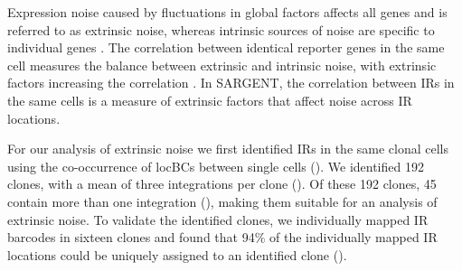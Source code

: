 Expression noise caused by fluctuations in global factors affects all genes and is referred to as extrinsic noise, whereas intrinsic sources of noise are specific to individual genes \cite{deyss_arkinap:OrthogonalControl2015, stewart-ornsteinj_el-samadh:CellularNoise2012, sancheza_goldingi:GeneticDeterminants2013, raserjm_osheaek:ControlStochasticity2004, zopfcj_maheshrin:CellCycleDependence2013, vallaniaflm_mitrard:OriginConsequences2014}. The correlation between identical reporter genes in the same cell measures the balance between extrinsic and intrinsic noise, with extrinsic factors increasing the correlation \cite{elowitzmb_swainps:StochasticGene2002}. In SARGENT, the correlation between IRs in the same cells is a measure of extrinsic factors that affect noise across IR locations. 

For our analysis of extrinsic noise we first identified IRs in the same clonal cells using the co-occurrence of locBCs between single cells (). We identified 192 clones, with a mean of three integrations per clone (). Of these 192 clones, 45 contain more than one integration (), making them suitable for an analysis of extrinsic noise. To validate the identified clones, we individually mapped IR barcodes in sixteen clones and found that 94\% of the individually mapped IR locations could be uniquely assigned to an identified clone (). 

